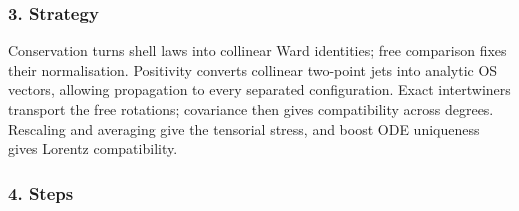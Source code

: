 \documentclass[
  letterpaper,
  11pt]{article}
\begin{document}
\subsubsection{3. Strategy}\label{strategy-23}

Conservation turns shell laws into collinear Ward identities; free
comparison fixes their normalisation. Positivity converts collinear
two-point jets into analytic OS vectors, allowing propagation to every
separated configuration. Exact intertwiners transport the free
rotations; covariance then gives compatibility across degrees. Rescaling
and averaging give the tensorial stress, and boost ODE uniqueness gives
Lorentz compatibility.

\subsubsection{4. Steps}\label{steps-23}
\end{document}
